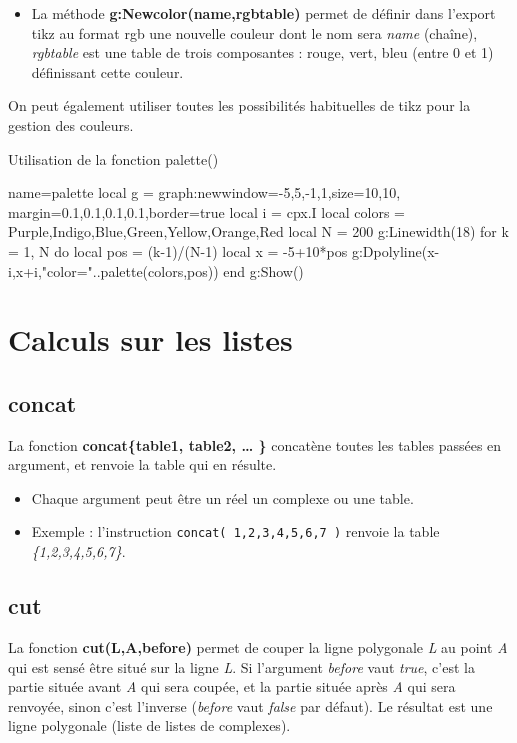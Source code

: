 \begin{itemize}
    \item La méthode \textbf{g:Newcolor(name,rgbtable)} permet de définir dans l'export tikz au format rgb une nouvelle couleur dont le nom sera \emph{name} (chaîne), \emph{rgbtable} est une table de trois composantes : rouge, vert, bleu (entre 0 et 1) définissant cette couleur.
    
\end{itemize}
On peut également utiliser toutes les possibilités habituelles de tikz pour la gestion des couleurs.

\begin{demo}{Utilisation de la fonction palette()}
\begin{luadraw}{name=palette}
local g = graph:new{window={-5,5,-1,1},size={10,10},
      margin={0.1,0.1,0.1,0.1},border=true}
local i = cpx.I
local colors = {Purple,Indigo,Blue,Green,Yellow,Orange,Red}
local N = 200
g:Linewidth(18)
for k = 1, N do
    local pos = (k-1)/(N-1)
    local x = -5+10*pos
    g:Dpolyline({x-i,x+i},"color="..palette(colors,pos))
end
g:Show()
\end{luadraw}
\end{demo}

\section{Calculs sur les listes}

\subsection{concat}
La fonction \textbf{concat\{table1, table2, \ldots{} \}} concatène toutes les tables passées en argument, et renvoie la table qui en résulte.

\begin{itemize}
 \item Chaque argument peut être un réel un complexe ou une table.
\item Exemple : l'instruction \texttt{concat( 1,2,3,{4,5,6},7 )} renvoie la table \emph{\{1,2,3,4,5,6,7\}}.
\end{itemize}

\subsection{cut}
La fonction \textbf{cut(L,A,before)} permet de couper la ligne polygonale \emph{L} au point \emph{A} qui est sensé être situé sur la ligne \emph{L}. Si l'argument \emph{before} vaut \emph{true}, c'est la partie située avant \emph{A} qui sera coupée, et la partie située après \emph{A} qui sera renvoyée, sinon c'est l'inverse (\emph{before} vaut \emph{false} par défaut). Le résultat est une ligne polygonale (liste de listes de complexes).

